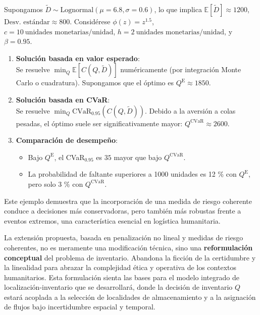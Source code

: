 \documentclass[
  spanish,
  us-letterpaper,
  DIV=11,
  numbers=noendperiod]{scrreprt}
\providecommand{\tightlist}{%
  \setlength{\itemsep}{0pt}\setlength{\parskip}{0pt}}
\numberwithin{equation}{section}
\begin{document}
Supongamos \(\tilde{D} \sim \text{Lognormal}(\mu = 6.8, \sigma = 0.6)\),
lo que implica \(\mathbb{E}[\tilde{D}] \approx 1200\),
\(\text{Desv. estándar} \approx 800\). Considérese
\(\phi(z) = z^{1.5}\), \(c = 10~\text{unidades monetarias/unidad}\),
\(h = 2~\text{unidades monetarias/unidad}\), y \(\beta = 0.95\).

\begin{enumerate}
\def\labelenumi{\arabic{enumi}.}
\item
  \textbf{Solución basada en valor esperado}:\\
  Se resuelve \(\min_Q \mathbb{E}[C(Q, \tilde{D})]\) numéricamente (por
  integración Monte Carlo o cuadratura). Supongamos que el óptimo es
  \(Q^{\text{E}} \approx 1850\).
\item
  \textbf{Solución basada en CVaR}:\\
  Se resuelve \(\min_Q \text{CVaR}_{0.95}(C(Q, \tilde{D}))\). Debido a
  la aversión a colas pesadas, el óptimo suele ser significativamente
  mayor: \(Q^{\text{CVaR}} \approx 2600\).
\item
  \textbf{Comparación de desempeño}:

  \begin{itemize}
  \tightlist
  \item
    Bajo \(Q^{\text{E}}\), el CVaR\(_{0.95}\) es \(35%
    \) mayor que bajo \(Q^{\text{CVaR}}\).\\
  \item
    La probabilidad de faltante superiores a 1000 unidades es 12 \% con
    \(Q^{\text{E}}\), pero solo 3 \% con \(Q^{\text{CVaR}}\).
  \end{itemize}
\end{enumerate}

Este ejemplo demuestra que la incorporación de una medida de riesgo
coherente conduce a decisiones más conservadoras, pero también más
robustas frente a eventos extremos, una característica esencial en
logística humanitaria.

La extensión propuesta, basada en penalización no lineal y medidas de
riesgo coherentes, no es meramente una modificación técnica, sino una
\textbf{reformulación conceptual} del problema de inventario. Abandona
la ficción de la certidumbre y la linealidad para abrazar la complejidad
ética y operativa de los contextos humanitarios. Esta formulación sienta
las bases para el modelo integrado de localización-inventario que se
desarrollará, donde la decisión de inventario \(Q\) estará acoplada a la
selección de localidades de almacenamiento y a la asignación de flujos
bajo incertidumbre espacial y temporal.
\end{document}
